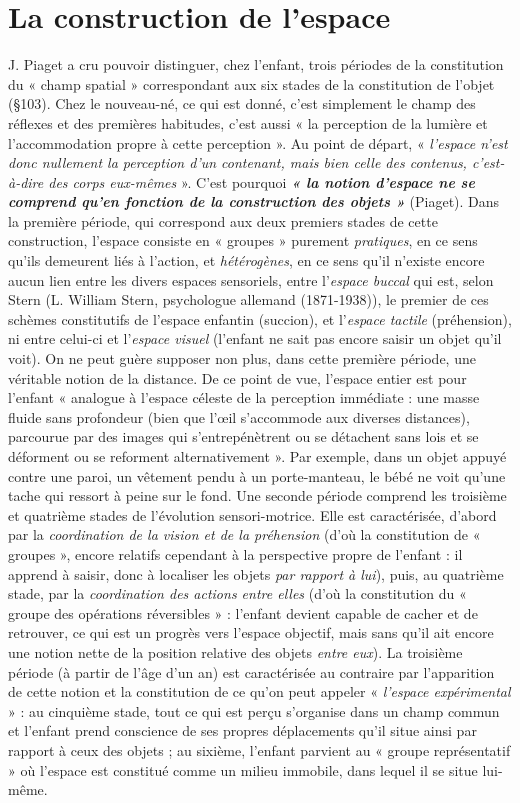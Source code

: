 \section{La construction de l’espace}%
J. Piaget a cru pouvoir
distinguer, chez l’enfant, trois périodes de la constitution du
« champ spatial » correspondant aux six stades de la constitution de
l’objet (\S 103). Chez le nouveau-né, ce qui est donné, c’est simplement
le champ des réflexes et des premières habitudes, c’est aussi « la
perception de la lumière et l’accommodation propre à cette perception ».
Au point de départ, « {\it l’espace n’est donc nullement la perception
d’un contenant, mais bien celle des contenus, c’est-à-dire des corps
eux-mêmes} ». C’est pourquoi \textbf{\textit {« la notion d'espace ne se comprend
qu’en fonction de la construction des objets »}} (Piaget). Dans la première
période, qui correspond aux deux premiers stades de cette
construction, l’espace consiste en « groupes » purement {\it pratiques}, en
ce sens qu’ils demeurent liés à l’action, et {\it hétérogènes}, en ce sens
qu’il n'existe encore aucun lien entre les divers espaces sensoriels, entre
l’{\it espace buccal} qui est, selon Stern {\scriptsize (L. William Stern,
psychologue allemand (1871-1938))}, le premier de ces schèmes constitutifs
de l’espace enfantin (succion), et l’{\it espace tactile} (préhension), ni
entre celui-ci et l’{\it espace visuel} (l'enfant ne sait pas encore saisir un objet
qu’il voit). On ne peut guère supposer non plus, dans cette première
période, une véritable notion de la distance. De ce point de vue, l’espace
entier est pour l’enfant « analogue à l’espace céleste de la perception
immédiate : une masse fluide sans profondeur (bien que l’œil s’accommode
aux diverses distances), parcourue par des images qui s’entrepénètrent
ou se détachent sans lois et se déforment ou se reforment
alternativement ». Par exemple, dans un objet appuyé contre une
paroi, un vêtement pendu à un porte-manteau, le bébé ne voit qu’une
tache qui ressort à peine sur le fond. Une seconde période comprend
les troisième et quatrième stades de l’évolution sensori-motrice. Elle
est caractérisée, d’abord par la {\it coordination de la vision et de la préhension}
(d’où la constitution de « groupes », encore relatifs cependant à
la perspective propre de l’enfant : il apprend à saisir, donc à localiser
les objets {\it par rapport à lui}), puis, au quatrième stade, par la {\it coordination
des actions entre elles} (d’où la constitution du « groupe des
opérations réversibles » : l’enfant devient capable de cacher et de
retrouver, ce qui est un progrès vers l’espace objectif, mais sans qu’il
ait encore une notion nette de la position relative des objets {\it entre eux}).
La troisième période (à partir de l’âge d’un an) est caractérisée au
contraire par l’apparition de cette notion et la constitution de ce
qu’on peut appeler « {\it l’espace expérimental} » : au cinquième stade,
tout ce qui est perçu s'organise dans un champ commun et l’enfant
prend conscience de ses propres déplacements qu’il situe ainsi par
rapport à ceux des objets ; au sixième, l’enfant parvient au « groupe
représentatif » où l’espace est constitué comme un milieu immobile,
dans lequel il se situe lui-même.

